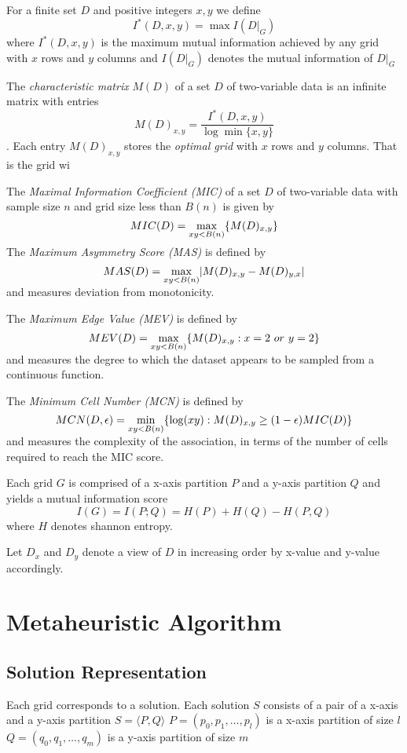 \documentclass[12pt]{article}
\begin{document}
For a finite set $D$ and positive integers $x,y$ we define $$I^*(D,x,y)=\max I(D|_G)$$
where $I^*(D,x,y)$ is the maximum mutual information achieved by any grid with $x$ rows and $y$ columns and $I(D|_G)$ denotes the mutual information of $D|_G$

The {\it characteristic matrix} $M(D)$ of a set $D$ of two-variable data is an infinite matrix with entries $$M(D)_{x,y}=\frac{I^*(D,x,y)}{\log \min\{x,y\}}$$.
Each entry $M(D)_{x,y}$ stores the {\it optimal grid} with $x$ rows and $y$ columns. That is the grid wi

The {\it Maximal Information Coefficient (MIC)} of a set $D$ of two-variable data with sample size $n$ and grid size less than $B(n)$ is given by
$$MIC(D)=\smash{\displaystyle\max_{xy<B(n)}} \{M(D)_{x,y}\}$$

The {\it Maximum Asymmetry Score (MAS)} is defined by $$MAS(D)=\smash{\displaystyle\max_{xy<B(n)}} |M(D)_{x,y}-M(D)_{y,x}|$$
and measures deviation from monotonicity.

The {\it Maximum Edge Value (MEV)} is defined by $$MEV(D)=\smash{\displaystyle\max_{xy<B(n)}} \{M(D)_{x,y}:x=2\ or\ y=2\}$$
and measures the degree to which the dataset appears to be sampled from a continuous function.

The {\it Minimum Cell Number (MCN)} is defined by $$MCN(D,\epsilon)=\smash{\displaystyle\min_{xy<B(n)}} \{\log(xy):M(D)_{x,y}\geq(1-\epsilon)MIC(D)\}$$
and measures the complexity of the association, in terms of the number of cells required to reach the MIC score.

Each grid $G$ is comprised of a x-axis partition $P$ and a y-axis partition $Q$
and yields a mutual information score $$I(G)=I(P;Q)=H(P)+H(Q)-H(P,Q)$$ where $H$ denotes shannon entropy.

Let $D_x$ and $D_y$ denote a view of $D$ in increasing order by x-value and y-value accordingly.




\section{Metaheuristic Algorithm}
\label{sec:algorithm}
\subsection{Solution Representation}
Each grid corresponds to a solution.
Each solution $S$ consists of a pair of a x-axis and a y-axis partition $S=\langle P, Q \rangle$
$P=(p_0,p_1,\ldots,p_l)$ is a x-axis partition of size $l$
$Q=(q_0,q_1,\ldots,q_m)$ is a y-axis partition of size $m$
\end{document}
